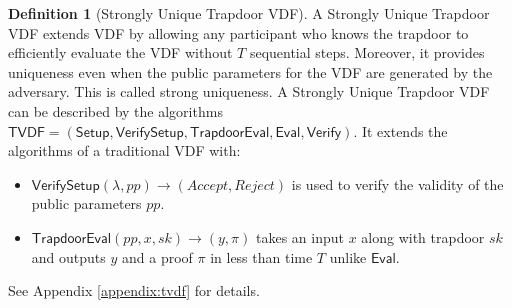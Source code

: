 \documentclass[letterpaper,twocolumn,10pt]{article}
\theoremstyle{definition}
\newtheorem{definition}[theorem]{Definition}
\theoremstyle{remark}
\begin{document}
\begin{definition}[Strongly Unique Trapdoor VDF]
A Strongly Unique Trapdoor VDF extends VDF by allowing any participant who knows the trapdoor to efficiently evaluate the VDF without $T$ sequential steps. Moreover, it provides uniqueness even when the public parameters for the VDF are generated by the adversary. This is called strong uniqueness. A Strongly Unique Trapdoor VDF can be described by the algorithms $\mathsf{TVDF = (Setup,VerifySetup, TrapdoorEval, Eval, Verify)}$. It extends the algorithms of a traditional VDF with:
\begin{itemize}
    \item $\mathsf{VerifySetup}(\lambda, pp) \rightarrow (Accept, Reject)$ is used to verify the validity of the public parameters $pp$.
    \item $\mathsf{TrapdoorEval}(pp,x,sk) \rightarrow (y, \pi)$ takes an input $x$ along with trapdoor $sk$ and outputs $y$ and a proof $\pi$ in less than time $T$ unlike $\mathsf{Eval}$.
\end{itemize}
See Appendix \ref{appendix:tvdf} for details.
\end{definition}
\end{document}
